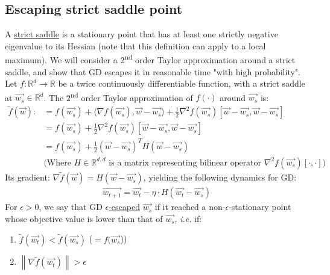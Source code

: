 \documentclass[12pt]{article}
\newcommand{\norm}[1]{\left\| #1 \right\|}
\newcommand{\ie}{{\it i.e. }}
\begin{document}
	\subsection{Escaping strict saddle point}
	A \underline{strict saddle} is a stationary point that has at least one strictly negative eigenvalue to its Hessian (note that this definition can apply to a local maximum). We will consider a 2\textsuperscript{nd} order Taylor approximation around a strict saddle, and show that GD escapes it in reasonable time "with high probability".
	\\ Let $f:\mathbb{R}^d\to\mathbb{R}$ be a twice continuously differentiable function, with a strict saddle at $\overrightarrow{w_s}\in\mathbb{R}^d$. The 2\textsuperscript{nd} order Taylor approximation of $f(\cdot)$ around $\overrightarrow{w_s}$ is:
	\begin{align*}
	    \tilde{f}(\overrightarrow{w}) :&= f(\overrightarrow{w_s}) + \langle\nabla{f(\overrightarrow{w_s})}, \overrightarrow{w} - \overrightarrow{w_s}\rangle + \frac{1}{2}\nabla^2f(\overrightarrow{w_s})[\overrightarrow{w} - \overrightarrow{w_s}, \overrightarrow{w} - \overrightarrow{w_s}] \\
	    & = f(\overrightarrow{w_s}) + \frac{1}{2}\nabla^2f(\overrightarrow{w_s})[\overrightarrow{w} - \overrightarrow{w_s}, \overrightarrow{w} - \overrightarrow{w_s}] \\
	    & = f(\overrightarrow{w_s}) + \frac{1}{2}(\overrightarrow{w} - \overrightarrow{w_s})^T H (\overrightarrow{w} - \overrightarrow{w_s}) \\
	    & \text{(Where $H\in\mathbb{R}^{d,d}$ is a matrix representing bilinear operator $\nabla^2f(\overrightarrow{w_s})[\cdot,\cdot]$)}
	\end{align*}
	Its gradient: $\nabla{\tilde{f}(\overrightarrow{w})} = H(\overrightarrow{w} - \overrightarrow{w_s})$, yielding the following dynamics for GD:
	\begin{align*}
	    \overrightarrow{w_{t+1}} = \overrightarrow{w_t} - \eta \cdot H(\overrightarrow{w_t} - \overrightarrow{w_s})
	\end{align*}
	For $\epsilon>0$, we say that GD \underline{$\epsilon$-escaped} $\overrightarrow{w_s}$ if it reached a non-$\epsilon$-stationary point whose objective value is lower than that of $\overrightarrow{w_s}$, \ie if:
	\begin{enumerate}
      \item $\tilde{f}(\overrightarrow{w_t}) < \tilde{f}(\overrightarrow{w_s})$ ($=f(\overrightarrow{w_s}$))
      \item $\norm{\nabla{\tilde{f}(\overrightarrow{w_t})}} > \epsilon $
    \end{enumerate}
\end{document}
